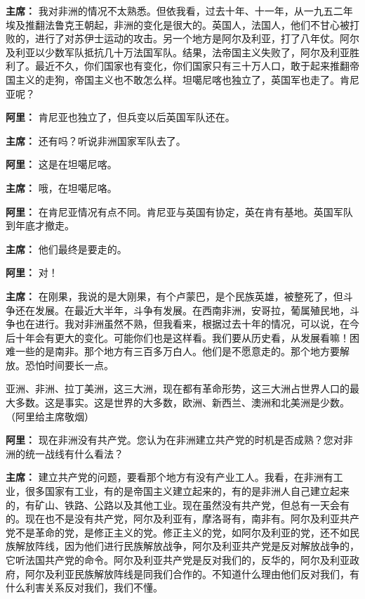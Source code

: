 \begin{duihua}
\item[\textbf{主席：}] 我对非洲的情况不太熟悉。但依我看，过去十年、十一年，从一九五二年埃及推翻法鲁克王朝起，非洲的变化是很大的。英国人，法国人，他们不甘心被打败的，进行了对苏伊士运动的攻击。另一个地方是阿尔及利亚，打了八年仗。阿尔及利亚以少数军队抵抗几十万法国军队。结果，法帝国主义失败了，阿尔及利亚胜利了。最近不久，你们国家也有变化，你们国家只有三十万人口，敢于起来推翻帝国主义的走狗，帝国主义也不敢怎么样。坦噶尼喀也独立了，英国军也走了。肯尼亚呢？

\item[\textbf{阿里：}] 肯尼亚也独立了，但兵变以后英国军队还在。

\item[\textbf{主席：}] 还有吗？听说非洲国家军队去了。

\item[\textbf{阿里：}] 这是在坦噶尼喀。

\item[\textbf{主席：}] 哦，在坦噶尼咯。

\item[\textbf{阿里：}] 在肯尼亚情况有点不同。肯尼亚与英国有协定，英在肯有基地。英国军队到年底才撤走。

\item[\textbf{主席：}] 他们最终是要走的。

\item[\textbf{阿里：}] 对！

\item[\textbf{主席：}] 在刚果，我说的是大刚果，有个卢蒙巴，是个民族英雄，被整死了，但斗争还在发展。在最近大半年，斗争有发展。在西南非洲，安哥拉，葡属殖民地，斗争也在进行。我对非洲虽然不熟，但我看来，根据过去十年的情况，可以说，在今后十年会有更大的变化。可能你们也是这样看。我们要从历史看，从发展看嘛！困难一些的是南非。那个地方有三百多万白人。他们是不愿意走的。那个地方要解放。恐怕时间要长一点。

亚洲、非洲、拉丁美洲，这三大洲，现在都有革命形势，这三大洲占世界人口的最大多数。这是事实。这是世界的大多数，欧洲、新西兰、澳洲和北美洲是少数。\\（阿里给主席敬烟）

\item[\textbf{阿里：}] 现在非洲没有共产党。您认为在非洲建立共产党的时机是否成熟？您对非洲的统一战线有什么看法？

\item[\textbf{主席：}] 建立共产党的问题，要看那个地方有没有产业工人。我看，在非洲有工业，很多国家有工业，有的是帝国主义建立起来的，有的是非洲人自己建立起来的，有矿山、铁路、公路以及其他工业。现在虽然没有共产党，但总有一天会有的。现在也不是没有共产党，阿尔及利亚有，摩洛哥有，南非有。阿尔及利亚共产党不是革命的党，是修正主义的党。修正主义的党，如阿尔及利亚的党，还不如民族解放阵线，因为他们进行民族解放战争，阿尔及利亚共产党是反对解放战争的，它听法国共产党的命令。阿尔及利亚共产党是反对我们的，反华的，阿尔及利亚政府，阿尔及利亚民族解放阵线是同我们合作的。不知道什么理由他们反对我们，有什么利害关系反对我们，我们不懂。


\end{duihua}
